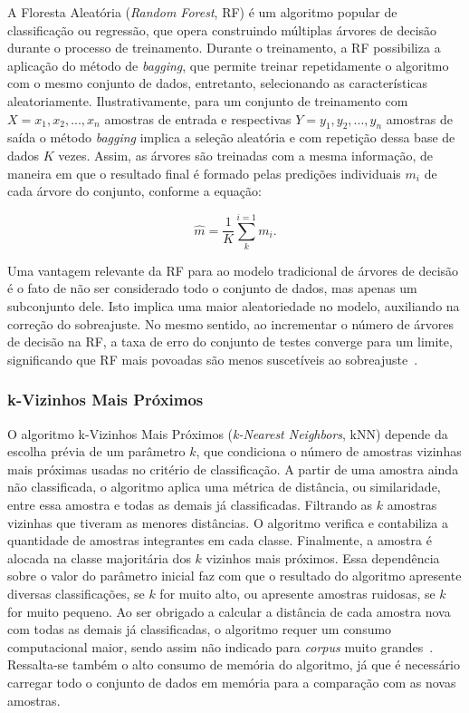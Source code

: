 \documentclass{SBCbookchapter}
\begin{document}
A Floresta Aleatória (\textit{Random Forest}, RF) é um algoritmo popular de classificação ou regressão, que opera construindo múltiplas árvores de decisão durante o processo de treinamento. Durante o treinamento, a RF possibiliza a aplicação do método de \textit{bagging}, que permite treinar repetidamente o algoritmo com o mesmo conjunto de dados, entretanto, selecionando as características aleatoriamente. Ilustrativamente, para um conjunto de treinamento com $X = x_1,x_2,...,x_n$ amostras de entrada e respectivas $Y = y_1,y_2,...,y_n$ amostras de saída o método \textit{bagging} implica a seleção aleatória e com repetição dessa base de dados $K$ vezes. Assim, as árvores são treinadas com a mesma informação, de maneira em que o resultado final é formado pelas predições individuais $m_i$ de cada árvore do conjunto, conforme a equação:

\begin{equation}
    \hat{m} = \frac{1}{K} \sum_{k}^{i=1}m_{i}.
\end{equation}

Uma vantagem relevante da RF para ao modelo tradicional de árvores de decisão é o fato de não ser considerado todo o conjunto de dados, mas apenas um subconjunto dele. Isto implica uma maior aleatoriedade no modelo, auxiliando na correção do sobreajuste. No mesmo sentido, ao incrementar o número de árvores de decisão na RF, a taxa de erro do conjunto de testes converge para um limite, significando que RF mais povoadas são menos suscetíveis ao sobreajuste~\cite{verikas2011mining}. 

\subsubsection{k-Vizinhos Mais Próximos}
\label{subsec:kvizinhos}

O algoritmo k-Vizinhos Mais Próximos (\textit{k-Nearest Neighbors}, kNN) depende da escolha prévia de um parâmetro $k$, que condiciona o número de amostras vizinhas mais próximas usadas no critério de classificação. A partir de uma amostra ainda não classificada, o algoritmo aplica uma métrica de distância, ou similaridade, entre essa amostra e todas as demais já classificadas. Filtrando as $k$ amostras vizinhas que tiveram as menores distâncias. O algoritmo verifica e contabiliza a quantidade de amostras integrantes em cada classe. Finalmente, a amostra é alocada na classe majoritária dos $k$ vizinhos mais próximos. Essa dependência sobre o valor do parâmetro inicial faz com que o resultado do algoritmo apresente diversas classificações, se $k$ for muito alto, ou apresente amostras ruidosas, se $k$ for muito pequeno. Ao ser obrigado a calcular a distância de cada amostra nova com todas as demais já classificadas, o algoritmo requer um consumo computacional maior, sendo assim não indicado para \textit{corpus} muito grandes~\cite{kadhim2019survey}. Ressalta-se também o alto consumo de memória do algoritmo, já que é necessário carregar todo o conjunto de dados em memória para a comparação com as novas amostras.
\end{document}

